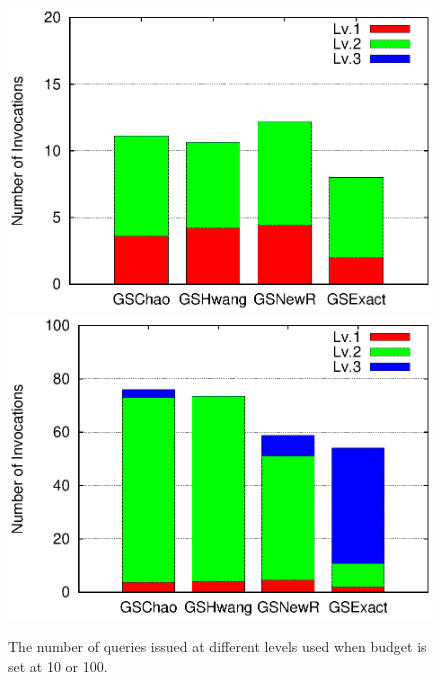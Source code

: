 \begin{figure}[h]
	\vspace{-10pt}
    \includegraphics[clip,scale=0.32]{figs/levelBudget10.eps}
	\hspace{-10pt}
	\includegraphics[clip,scale=0.32]{figs/levelBudget100.eps}
	\vspace{-10pt}
	\caption{The number of queries issued at different levels used when budget is set at 10 or 100.}\label{fig:level}
	\vspace{-10pt}
\end{figure}

